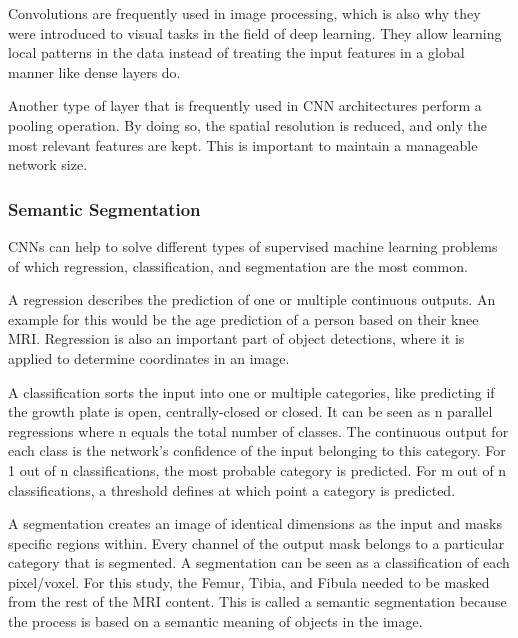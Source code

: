 Convolutions are frequently used in image processing, which is also why they were introduced to visual tasks in the field of deep learning. They allow learning local patterns in the data instead of treating the input features in a global manner like dense layers do.

Another type of layer that is frequently used in CNN architectures perform a pooling operation. By doing so, the spatial resolution is reduced, and only the most relevant features are kept. This is important to maintain a manageable network size.

\subsubsection{Semantic Segmentation}

CNNs can help to solve different types of supervised machine learning problems of which regression, classification, and segmentation are the most common.

A regression describes the prediction of one or multiple continuous outputs. An example for this would be the age prediction of a person based on their knee MRI. Regression is also an important part of object detections, where it is applied to determine coordinates in an image.

A classification sorts the input into one or multiple categories, like predicting if the growth plate is open, centrally-closed or closed. It can be seen as n parallel regressions where n equals the total number of classes. The continuous output for each class is the network's confidence of the input belonging to this category. For 1 out of n classifications, the most probable category is predicted. For m out of n classifications, a threshold defines at which point a category is predicted.

A segmentation creates an image of identical dimensions as the input and masks specific regions within. Every channel of the output mask belongs to a particular category that is segmented. A segmentation can be seen as a classification of each pixel/voxel. For this study, the Femur, Tibia, and Fibula needed to be masked from the rest of the MRI content. This is called a semantic segmentation because the process is based on a semantic meaning of objects in the image.

